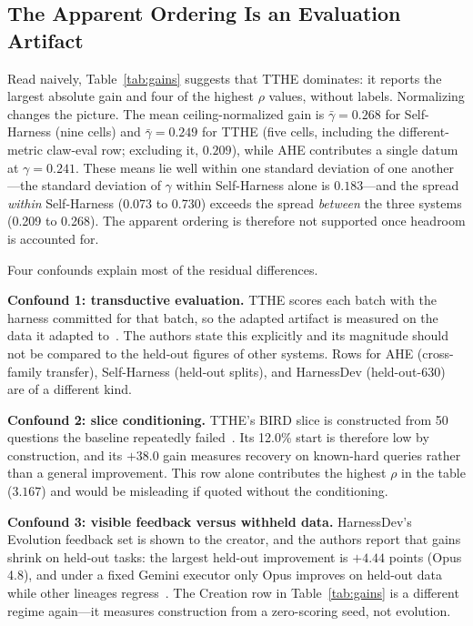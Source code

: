 \documentclass[conference]{IEEEtran}
\begin{document}
\subsection{The Apparent Ordering Is an Evaluation Artifact}

Read naively, Table~\ref{tab:gains} suggests that TTHE dominates: it reports the largest absolute gain and four of the highest $\rho$ values, without labels. Normalizing changes the picture. The mean ceiling-normalized gain is $\bar{\gamma}=0.268$ for Self-Harness (nine cells) and $\bar{\gamma}=0.249$ for TTHE (five cells, including the different-metric claw-eval row; excluding it, $0.209$), while AHE contributes a single datum at $\gamma=0.241$. These means lie well within one standard deviation of one another---the standard deviation of $\gamma$ within Self-Harness alone is $0.183$---and the spread \emph{within} Self-Harness (0.073 to 0.730) exceeds the spread \emph{between} the three systems (0.209 to 0.268). The apparent ordering is therefore not supported once headroom is accounted for.

Four confounds explain most of the residual differences.

\textbf{Confound 1: transductive evaluation.} TTHE scores each batch with the harness committed for that batch, so the adapted artifact is measured on the data it adapted to~\cite{b5}. The authors state this explicitly and its magnitude should not be compared to the held-out figures of other systems. Rows for AHE (cross-family transfer), Self-Harness (held-out splits), and HarnessDev (held-out-630) are of a different kind.

\textbf{Confound 2: slice conditioning.} TTHE's BIRD slice is constructed from 50 questions the baseline repeatedly failed~\cite{b5}. Its 12.0\% start is therefore low by construction, and its $+38.0$ gain measures recovery on known-hard queries rather than a general improvement. This row alone contributes the highest $\rho$ in the table ($3.167$) and would be misleading if quoted without the conditioning.

\textbf{Confound 3: visible feedback versus withheld data.} HarnessDev's Evolution feedback set is shown to the creator, and the authors report that gains shrink on held-out tasks: the largest held-out improvement is $+4.44$ points (Opus 4.8), and under a fixed Gemini executor only Opus improves on held-out data while other lineages regress~\cite{b6}. The Creation row in Table~\ref{tab:gains} is a different regime again---it measures construction from a zero-scoring seed, not evolution.
\end{document}
